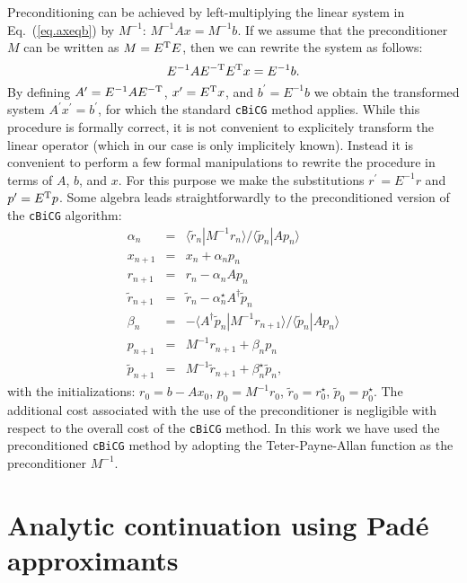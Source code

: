\documentclass[twocolumn,prb,showpacs,superscriptaddress]{revtex4}
\def\>{\rangle}
\def\<{\langle}
\def\rt{\tilde{r}}
\def\pt{\tilde{p}}
\begin{document}
Preconditioning can be achieved by left-multiplying the linear system 
in Eq.\ (\ref{eq.axeqb}) 
by $M^{-1}$: $M^{-1}Ax=M^{-1}b$. If we assume that the preconditioner $M$ can be 
written as $M=E^{\rm T}E$, then we can rewrite the system as follows:
  \begin{equation}
  E^{-1}AE^{-{\rm T}} E^{\rm T}x = E^{-1}b.
  \end{equation}
By defining $A^\prime=E^{-1}AE^{-{\rm T}}$, $x^\prime=E^{\rm T}x$, and $b^\prime=E^{-1}b$
we obtain the transformed system $A^\prime x^\prime=b^\prime$, for which the
standard {\tt cBiCG} method applies.
While this procedure is formally correct, it is not convenient to explicitely
transform the linear operator (which in our case is only implicitely
known). Instead it is convenient to perform a few formal manipulations 
to rewrite the procedure in terms of
$A$, $b$, and $x$. For this purpose we make the substitutions
$r^\prime = E^{-1}r$ and $p^\prime=E^{\rm T} p$. Some algebra leads straightforwardly
to the preconditioned version of the {\tt cBiCG} algorithm:
  \begin{eqnarray}
  \alpha_n & = & \<\rt_n|M^{-1}r_n\>/\<\pt_n|Ap_n\>  \\
  x_{n+1} & = & x_n + \alpha_n p_n \\ 
  r_{n+1} & = & r_n - \alpha_n Ap_n \\ 
  \rt_{n+1} & = & \rt_n - \alpha_n^\star A^\dagger \pt_n \\ 
  \beta_n & = & - \<A^\dagger\pt_n|M^{-1}r_{n+1}\>/\<\pt_n|Ap_n\> \\ 
  p_{n+1} & = & M^{-1}r_{n+1} + \beta_n p_n \\ 
  \pt_{n+1} & = & M^{-1}\rt_{n+1} + \beta_n^\star \pt_n, 
  \end{eqnarray}
with the initializations: $r_0=b-Ax_0$, $p_0=M^{-1}r_0$, $\rt_0=r_0^\star$,
$\pt_0=p_0^\star$.
The additional cost associated with the use of the preconditioner is negligible
with respect to the overall cost of the {\tt cBiCG} method.
In this work we have used the preconditioned {\tt cBiCG} method 
by adopting the Teter-Payne-Allan function as the preconditioner $M^{-1}$.\cite{tpa}

\section{Analytic continuation using Pad\'e approximants}
\end{document}
